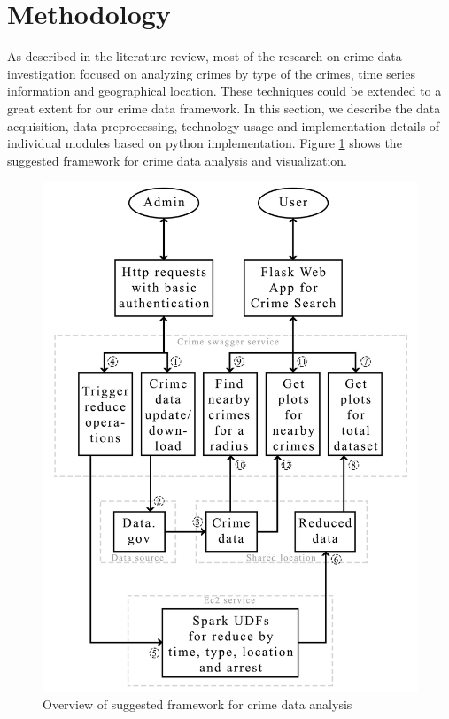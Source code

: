 \section{Methodology}
As described in the literature review, most of the research on crime data investigation focused on analyzing crimes by type of the crimes, time series information and geographical location. These techniques could be extended to a great extent for our crime data framework. In this section, we describe the data acquisition, data preprocessing, technology usage and implementation details of individual modules based on python implementation. Figure \ref{fig:overview} shows the suggested framework for crime data analysis and visualization.

\begin{figure}[htb]
	\centering\includegraphics[width=\columnwidth]{../images/overview.jpg}
	\caption{Overview of suggested framework for crime data analysis}
	\label{fig:overview}
\end{figure}

